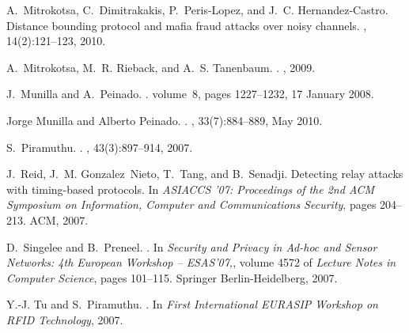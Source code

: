 \documentclass{article}
\begin{document}
\begin{thebibliography}{99}
A.~Mitrokotsa, C.~Dimitrakakis, P.~Peris-Lopez, and J.~C. Hernandez-Castro.
\newblock Distance bounding protocol and mafia fraud attacks over noisy
  channels.
, 14(2):121--123, 2010.

A.~Mitrokotsa, M.~R. Rieback, and A.~S. Tanenbaum.
.
, 2009.

J.~Munilla and A.~Peinado.
.
\newblock volume~8, pages 1227--1232, 17 January 2008.

Jorge Munilla and Alberto Peinado.
.
, 33(7):884--889, May 2010.

S.~Piramuthu.
.
, 43(3):897--914, 2007.

J.~Reid, J.~M. Gonzalez~Nieto, T.~Tang, and B.~Senadji.
\newblock Detecting relay attacks with timing-based protocols.
\newblock In {\em ASIACCS '07: Proceedings of the 2nd ACM Symposium on
  Information, Computer and Communications Security}, pages 204--213. ACM,
  2007.

D.~Singelee and B.~Preneel.
.
\newblock In {\em Security and Privacy in Ad-hoc and Sensor Networks: 4th
  European Workshop -- ESAS'07,}, volume 4572 of {\em Lecture Notes in Computer
  Science}, pages 101--115. Springer Berlin-Heidelberg, 2007.

Y.-J. Tu and S.~Piramuthu.
.
\newblock In {\em First International EURASIP Workshop on RFID Technology},
  2007.

\end{thebibliography}
\end{document}
